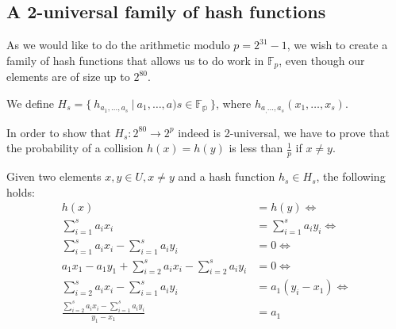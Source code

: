 \documentclass[article,a4paper,oneside]{article}
\newcommand{\+}[1]{\ensuremath{\boldsymbol{#1}}}
\begin{document}
\subsection*{A 2-universal family of hash functions}
As we would like to do the arithmetic modulo $p = 2^{31}-1$, we wish to create a family of hash functions that allows us to do work in $\mathbb{F}_p$, even though our elements are of size up to $2^{80}$.

We define $H_s=\{\ h_{a_1,\ldots,a_s}\ | \ a_1,\ldots,a)s\in \mathbb{F_p}\ \}$,
where $h_{a_,\ldots,a_s}(x_1,\ldots,x_s)$.

In order to show that $H_s: 2^{80} \rightarrow 2^p$ indeed is 2-universal, we have to prove that the probability of a collision $h(x) = h(y)$ is less than $\frac{1}{p}$ if $x \neq y$.

Given two elements $x,y \in U, x \neq y$ and a hash function $h_s \in H_s$, the following holds:
\begin{align*}
h(x) &= h(y) \iff \\
\sum_{i=1}^{s}a_ix_i &= \sum_{i=1}^sa_iy_i \iff \\
\sum_{i=1}^{s}a_ix_i - \sum_{i=1}^sa_iy_i &= 0 \iff \\
a_1x_1 - a_1y_1 + \sum_{i=2}^{s}a_ix_i - \sum_{i=2}^sa_iy_i &= 0 \iff \\
\sum_{i=2}^{s}a_ix_i - \sum_{i=1}^sa_iy_i &= a_1(y_i-x_1) \iff \\
\frac{\sum_{i=2}^{s}a_ix_i - \sum_{i=1}^sa_iy_i}{y_1-x_1} &= a_1 \\
\end{align*}
\end{document}
